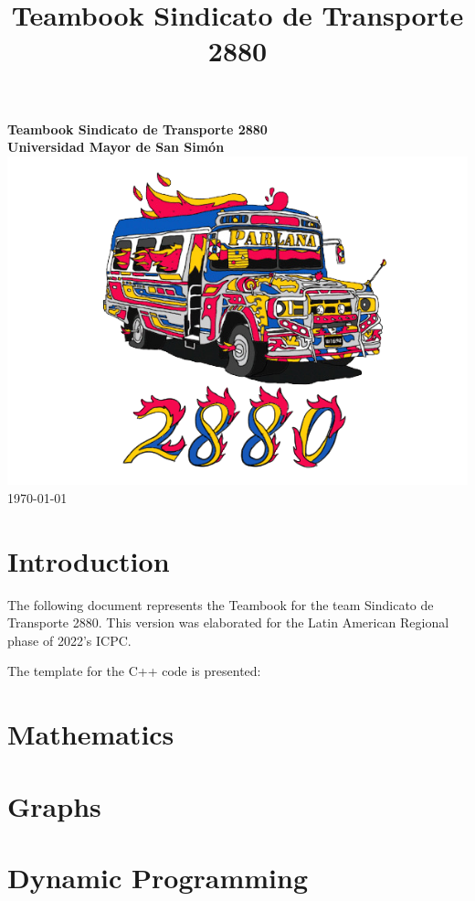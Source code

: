 \documentclass[landscape,twocolumn, 7pt, letterpaper]{book}
\begin{document}
\title{Teambook Sindicato de Transporte 2880}
\begin{titlepage}
  \centering
  \vfill
  {\bfseries\Huge
  Teambook Sindicato de Transporte 2880\\
  \vspace{2cm}
  Universidad Mayor de San Simón\\
  }    
  \vfill
  \includegraphics[width=14cm]{../Figures/LogoSdT2880.png} %
  \vfill
  \LARGE{\today}
\end{titlepage}

\tableofcontents

\chapter{Introduction}

The following document represents the Teambook for the team Sindicato de Transporte 2880. This version was elaborated for the Latin American Regional phase of 2022's ICPC.

The template for the C++ code is presented:




\chapter{Mathematics}


\chapter{Graphs}


\chapter{Dynamic Programming}

\end{document}
